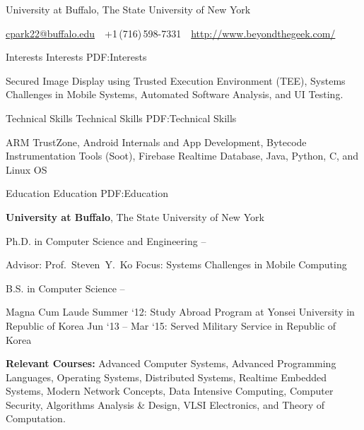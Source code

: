 \documentclass[letterpaper,MMMyyyy,nonstopmode]{simpleresumecv}
\newcommand{\CVAuthor}{Chang Min Park}
\newcommand{\CVWebpage}{http://www.beyondthegeek.com/}
\begin{document}

\Title{\CVAuthor}

\begin{SubTitle}
University at Buffalo, The State University of New York
\par
\href{mailto:cpark22@buffalo.edu}
{cpark22@buffalo.edu}
\,\SubBulletSymbol\,
+1\,(716)\,598-7331
\,\SubBulletSymbol\,
\href{\CVWebpage}
{\url{\CVWebpage}}
\end{SubTitle}

\begin{Body}


\Section
{Interests}
{Interests}
{PDF:Interests}

\Entry
Secured Image Display using Trusted Execution Environment (TEE), Systems Challenges in Mobile Systems, 
Automated Software Analysis, and UI Testing.


\Section
{Technical Skills}
{Technical Skills}
{PDF:Technical Skills}

\Entry
ARM TrustZone, Android Internals and App Development, Bytecode Instrumentation Tools (Soot),
Firebase Realtime Database, Java, Python, C, and Linux OS
\BigGap


\Section
{Education}
{Education}
{PDF:Education}

\Entry
\textbf{University at Buffalo}, The State University of New York

\Gap
\BulletItem
Ph.D. in Computer Science and Engineering
\hfill
{} --
\begin{Detail}
\SubBulletItem
Advisor:
Prof.~Steven~Y.~Ko
\SubBulletItem
Focus:
Systems Challenges in Mobile Computing
\end{Detail}

\Gap
\BulletItem
B.S. in Computer Science
\hfill
{} --
\begin{Detail}
\SubBulletItem
Magna Cum Laude
\SubBulletItem
Summer `12: Study Abroad Program at Yonsei University in Republic of Korea
\SubBulletItem
Jun `13 -- Mar `15: Served Military Service in Republic of Korea
\end{Detail}


\BigGap
\Entry
\textbf{Relevant Courses:} Advanced Computer Systems, Advanced Programming Languages, 
Operating Systems, Distributed Systems, Realtime Embedded Systems, Modern Network Concepts, 
Data Intensive Computing, Computer Security, Algorithms Analysis \& Design,
VLSI Electronics, and Theory of Computation.


\end{Body}
\end{document}
